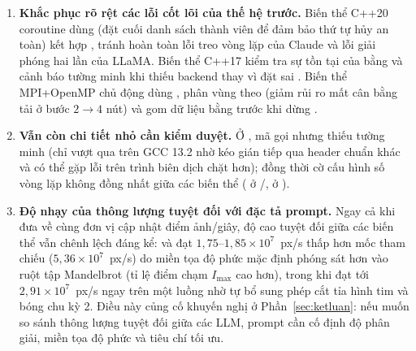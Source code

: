 \begin{enumerate}
  \item \textbf{Khắc phục rõ rệt các lỗi cốt lõi của thế hệ trước.} Biến thể
        C++20 coroutine dùng  (đặt cuối danh sách thành viên để
        đảm bảo thứ tự hủy an toàn) kết hợp , tránh hoàn toàn lỗi
        treo vòng lặp  của Claude và lỗi giải phóng hai lần của LLaMA.
        Biến thể C++17 kiểm tra sự tồn tại của  bằng
         và cảnh báo tường minh khi thiếu backend thay vì
        đặt sai . Biến thể MPI+OpenMP chủ động dùng
        , phân vùng  theo 
        (giảm rủi ro mất cân bằng tải ở bước $2\to 4$ nút) và gom dữ liệu bằng
         trước khi dừng .
  \item \textbf{Vẫn còn chi tiết nhỏ cần kiểm duyệt.} Ở , mã gọi
         nhưng thiếu  tường minh (chỉ
        vượt qua trên GCC 13.2 nhờ kéo gián tiếp qua header chuẩn khác và có thể
        gặp lỗi trên trình biên dịch chặt hơn); đồng thời cờ cấu hình số vòng lặp
        không đồng nhất giữa các biến thể ( ở /,
         ở ).
  \item \textbf{Độ nhạy của thông lượng tuyệt đối với đặc tả prompt.} Ngay cả khi
        đưa về cùng đơn vị cập nhật điểm ảnh/giây, độ cao tuyệt đối giữa các biến
        thể vẫn chênh lệch đáng kể:  và  đạt
        $1{,}75\text{--}1{,}85\times 10^7$~px/s thấp hơn mốc tham chiếu
        ($5{,}36\times 10^7$~px/s) do miền tọa độ phức mặc định phóng sát hơn vào
        ruột tập Mandelbrot (tỉ lệ điểm chạm $I_{\max}$ cao hơn), trong khi
         đạt tới $2{,}91\times 10^7$~px/s ngay trên một luồng
        nhờ tự bổ sung phép cắt tỉa hình tim và bóng chu kỳ 2. Điều này củng cố
        khuyến nghị ở Phần~\ref{sec:ketluan}: nếu muốn so sánh thông lượng tuyệt
        đối giữa các LLM, prompt cần cố định độ phân giải, miền tọa độ phức và
        tiêu chí tối ưu.
\end{enumerate}
